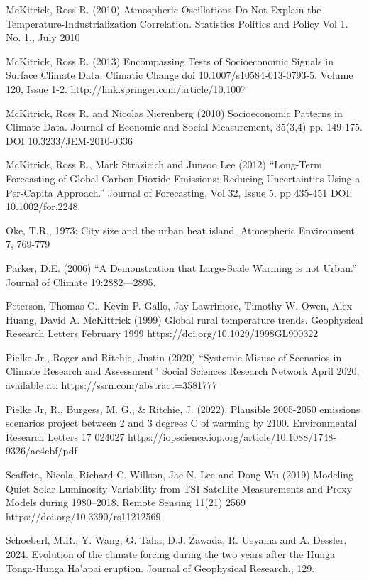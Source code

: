 \documentclass[12pt,paper=a4,DIV=12,parskip=never,chapterprefix=false,headings=standardclasses]{scrreprt}
\begin{document}
McKitrick, Ross R. (2010) Atmospheric Oscillations Do Not Explain the Temperature-Industrialization
Correlation. Statistics Politics and Policy Vol 1. No. 1., July 2010

McKitrick, Ross R. (2013) Encompassing Tests of Socioeconomic Signals in Surface Climate
Data. Climatic Change doi 10.1007/s10584-013-0793-5. Volume 120, Issue 1-2.
http://link.springer.com/article/10.1007%

McKitrick, Ross R. and Nicolas Nierenberg (2010) Socioeconomic Patterns in Climate Data. Journal of
Economic and Social Measurement, 35(3,4) pp. 149-175. DOI 10.3233/JEM-2010-0336

McKitrick, Ross R., Mark Strazicich and Junsoo Lee (2012) “Long-Term Forecasting of Global Carbon
Dioxide Emissions: Reducing Uncertainties Using a Per-Capita Approach.” Journal of
Forecasting, Vol 32, Issue 5, pp 435-451 DOI: 10.1002/for.2248.

Oke, T.R., 1973: City size and the urban heat island, Atmospheric Environment 7, 769-779

Parker, D.E. (2006) “A Demonstration that Large-Scale Warming is not Urban.” Journal of Climate
19:2882—2895.

Peterson, Thomas C., Kevin P. Gallo, Jay Lawrimore, Timothy W. Owen, Alex Huang, David A.
McKittrick (1999) Global rural temperature trends. Geophysical Research Letters February 1999
https://doi.org/10.1029/1998GL900322

Pielke Jr., Roger and Ritchie, Justin (2020) “Systemic Misuse of Scenarios in Climate Research and
Assessment” Social Sciences Research Network April 2020, available at:
https://ssrn.com/abstract=3581777

Pielke Jr, R., Burgess, M. G., \& Ritchie, J. (2022). Plausible 2005-2050 emissions scenarios project
between 2 and 3 degrees C of warming by 2100. Environmental Research Letters 17 024027
https://iopscience.iop.org/article/10.1088/1748-9326/ac4ebf/pdf

Scaffeta, Nicola, Richard C. Willson, Jae N. Lee and Dong Wu (2019) Modeling Quiet Solar Luminosity
Variability from TSI Satellite Measurements and Proxy Models during 1980–2018. Remote Sensing
11(21) 2569 https://doi.org/10.3390/rs11212569

Schoeberl, M.R., Y. Wang, G. Taha, D.J. Zawada, R. Ueyama and A. Dessler, 2024. Evolution of the
climate forcing during the two years after the Hunga Tonga-Hunga Ha’apai eruption. Journal of
Geophysical Research., 129.
\end{document}
